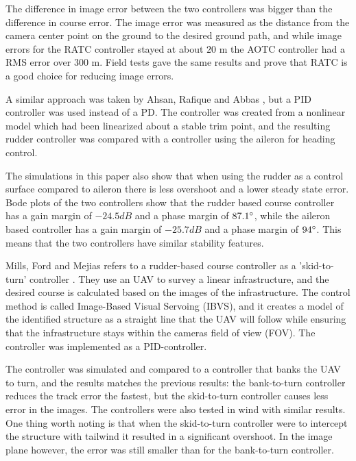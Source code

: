 The difference in image error between the two controllers was bigger than the difference in course error. The image error was measured as the distance from the camera center point on the ground to the desired ground path, and while image errors for the RATC controller stayed at about $20$ m the AOTC controller had a RMS error over $300$ m. Field tests gave the same results and prove that RATC is a good choice for reducing image errors.


A similar approach was taken by Ahsan, Rafique and Abbas \cite{alternateSurfaceAhsan}, but a PID controller was used instead of a PD. The controller was created from a nonlinear model which had been linearized about a stable trim point, and the resulting rudder controller was compared with a controller using the aileron for heading control.

The simulations in this paper also show that when using the rudder as a control surface compared to aileron there is less overshoot and a lower steady state error. Bode plots of the two controllers show that the rudder based course controller has a gain margin of $-24.5 dB$ and a phase margin of $87.1 \degree$, while the aileron based controller has a gain margin of $-25.7 dB$ and a phase margin of $94 \degree$. This means that the two controllers have similar stability features.

Mills, Ford and Mejias refers to a rudder-based course controller as a 'skid-to-turn' controller \cite{skidToTurnMills}. They use an UAV to survey a linear infrastructure, and the desired course is calculated based on the images of the infrastructure. The control method is called Image-Based Visual Servoing (IBVS), and it creates a model of the identified structure as a straight line that the UAV will follow while ensuring that the infrastructure stays within the cameras field of view (FOV). The controller was implemented as a PID-controller.

The controller was simulated and compared to a controller that banks the UAV to turn, and the results matches the previous results: the bank-to-turn controller reduces the track error the fastest, but the skid-to-turn controller causes less error in the images. The controllers were also tested in wind with similar results. One thing worth noting is that when the skid-to-turn controller were to intercept the structure with tailwind it resulted in a significant overshoot. In the image plane however, the error was still smaller than for the bank-to-turn controller.


